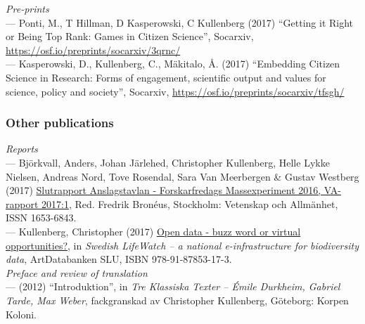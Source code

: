 \documentclass[a4paper,11pt,oneside]{article}
\begin{document}
   \noindent   \emph{Pre-prints}\\
     --- Ponti, M., T Hillman, D Kasperowski, C Kullenberg (2017) ``Getting it Right or Being Top Rank: Games in Citizen Science'', Socarxiv,
      \href{https://osf.io/preprints/socarxiv/3qrnc/}{https://osf.io/preprints/socarxiv/3qrnc/} \\
     --- Kasperowski, D., Kullenberg, C., Mäkitalo, Å. (2017) ``Embedding Citizen Science in Research: Forms of engagement, scientific output and values for science, policy and society'', Socarxiv,  \href{https://osf.io/preprints/socarxiv/tfsgh/}{https://osf.io/preprints/socarxiv/tfsgh/}\\


\subsubsection{Other publications}

   \noindent \emph{Reports}\\
   --- Björkvall, Anders, Johan Järlehed, Christopher Kullenberg, Helle Lykke Nielsen,
Andreas Nord, Tove Rosendal, Sara Van Meerbergen & Gustav Westberg (2017) \href{https://www.forskarfredag.se/filer/ff2016-anslagstavlan-slutrapport.pdf}{Slutrapport
   Anslagstavlan - Forskarfredags Massexperiment 2016, VA-rapport 2017:1}, Red. Fredrik Bronéus,
   Stockholm: Vetenskap och Allmänhet, ISSN 1653-6843.\\
   --- Kullenberg, Christopher (2017) \href{http://www.slu.se/globalassets/ew/subw/lifewatch/publikationer/slw-summary-report-web-170622.pdf}{Open data - buzz word or virtual opportunities?},
   in \emph{Swedish LifeWatch – a national e-infrastructure for biodiversity data}, ArtDatabanken SLU, ISBN
978-91-87853-17-3.\\



  \noindent \emph{Preface and review of translation}\\
    --- (2012) ``Introduktion'', in \emph{Tre Klassiska Texter – Émile Durkheim, Gabriel Tarde, Max Weber}, fackgranskad av Christopher Kullenberg, Göteborg: Korpen Koloni.\\
\end{document}
